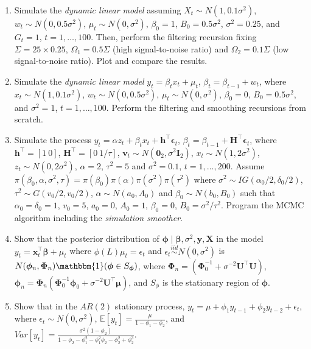 \begin{enumerate}
	\item Simulate the \textit{dynamic linear model} assuming $X_t\sim N(1, 0.1\sigma^2)$, $w_t\sim N(0, 0.5\sigma^2)$, $\mu_t\sim N(0, \sigma^2)$, $\beta_0=1$, ${B}_0=0.5\sigma^2$, $\sigma^2=0.25$, and ${G}_t=1$, $t=1,\dots,100$. Then, perform the filtering recursion fixing $\Sigma=25\times 0.25$, $\Omega_1=0.5\Sigma$ (high signal-to-noise ratio) and  $\Omega_2=0.1\Sigma$ (low signal-to-noise ratio). Plot and compare the results. 	
	
	\item Simulate the \textit{dynamic linear model} $y_t=\beta_t x_t + \mu_t$, $\beta_t=\beta_{t-1}+w_t$, where $x_t\sim N(1, 0.1\sigma^2)$, $w_t\sim N(0, 0.5\sigma^2)$, $\mu_t\sim N(0, \sigma^2)$, $\beta_0=0$, $B_0=0.5\sigma^2$, and $\sigma^2=1$, $t=1,\dots,100$. Perform the filtering and smoothing recursions from scratch. 	
	
	\item Simulate the process $y_t=\alpha z_t + \beta_t x_t + \bm{h}^{\top}\bm{\epsilon}_t$, $\beta_t=\beta_{t-1}+\bm{H}^{\top}\bm{\epsilon}_t$, where $\bm{h}^{\top}=[1 \ 0]$, $\bm{H}^{\top}=[0 \ 1/\tau]$, $\bm{v}_t\sim N(\bm{0}_2, \sigma^2\bm{I}_2)$, $x_t\sim N(1, 2\sigma^2)$, $z_t\sim N(0, 2\sigma^2)$, $\alpha=2$, $\tau^2=5$ and $\sigma^2=0.1$, $t=1,\dots,200$. Assume $\pi({\beta}_0,{\alpha},\sigma^2,{\tau})=\pi({\beta}_0)\pi({\alpha})\pi(\sigma^2)\pi(\tau^2)$ where $\sigma^2\sim IG(\alpha_0/2,\delta_0/2)$, $\tau^2\sim G(v_{0}/2,v_{0}/2)$, ${\alpha}\sim N({a}_0,{A}_0)$ and ${\beta}_0\sim N({b}_0,{B}_0)$ such that $\alpha_0=\delta_0=1$, $v_0=5$, $a_0=0$, $A_0=1$, $\beta_0=0$, $B_0=\sigma^2/\tau^2$. Program the MCMC algorithm including the \textit{simulation smoother}.
	
	\item Show that the posterior distribution of $\bm{\phi}\mid \bm{\beta},\sigma^2,\bm{y},\bm{X}$ in the model $y_t=\bm{x}_t^{\top}\bm{\beta}+\mu_t$ where $\phi(L)\mu_t=\epsilon_t$ and $\epsilon_t\stackrel{iid}{\sim}N(0,\sigma^2)$ is $N(\bm{\phi}_n, \bm{\Phi}_n)\mathbbm{1}(\bm{\phi}\in S_{\bm{\phi}})$, where $\bm{\Phi}_n=(\bm{\Phi}_0^{-1}+\sigma^{-2}\bm{U}^{\top}\bm{U})$, $\bm{\phi}_n=\bm{\Phi}_n(\bm{\Phi}_0^{-1}\bm{\phi}_0+\sigma^{-2}\bm{U}^{\top}\bm{\mu})$, and $S_{\phi}$ is the stationary region of $\bm{\phi}$.	  
	
	\item Show that in the $AR(2)$ stationary process, $y_t=\mu+\phi_1y_{t-1}+\phi_2y_{t-2}+\epsilon_t$, where $\epsilon_t\sim N(0,\sigma^2)$, $\mathbb{E}[y_t]=\frac{\mu}{1-\phi_1-\phi_2}$, and $Var[y_t]=\frac{\sigma^2(1-\phi_2)}{1-\phi_2-\phi_1^2-\phi_1^2\phi_2-\phi_2^2+\phi_2^3}$.
	

\end{enumerate}
